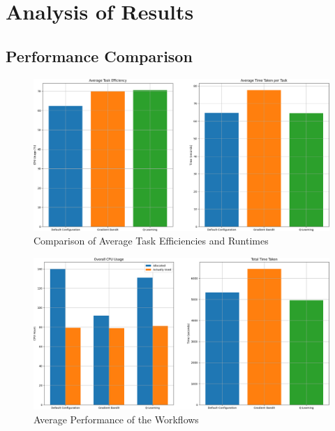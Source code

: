 \section{Analysis of Results}
\label{sec:analysis}

\subsection{Performance Comparison}
\label{sub:comp_perf}

\begin{figure}
    \centering
        \includegraphics[width=\textwidth]{fig/cropped_per_task_results.png}
        \caption{Comparison of Average Task Efficiencies and Runtimes}
        \label{fig:task_results}
\end{figure}

\begin{figure}
    \centering
        \includegraphics[width=\textwidth]{fig/cropped_wf_results.png}
        \caption{Average Performance of the Workflows}
        \label{fig:wf_results}
\end{figure}

